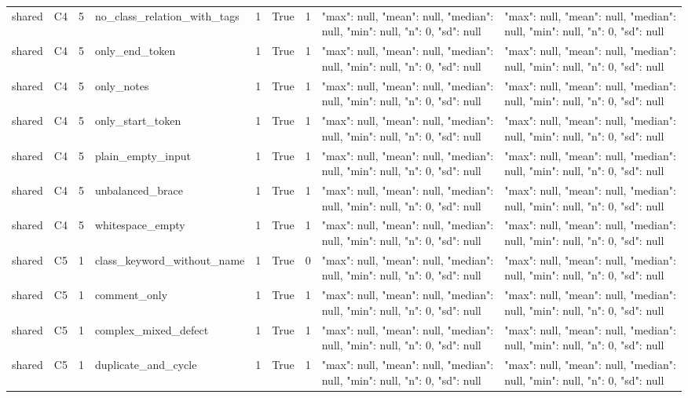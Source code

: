 \begin{tabular}{lllllllll}
shared & C4 & 5 & no\_class\_relation\_with\_tags & 1 & True & 1 & {"max": null, "mean": null, "median": null, "min": null, "n": 0, "sd": null} & {"max": null, "mean": null, "median": null, "min": null, "n": 0, "sd": null} \\
shared & C4 & 5 & only\_end\_token & 1 & True & 1 & {"max": null, "mean": null, "median": null, "min": null, "n": 0, "sd": null} & {"max": null, "mean": null, "median": null, "min": null, "n": 0, "sd": null} \\
shared & C4 & 5 & only\_notes & 1 & True & 1 & {"max": null, "mean": null, "median": null, "min": null, "n": 0, "sd": null} & {"max": null, "mean": null, "median": null, "min": null, "n": 0, "sd": null} \\
shared & C4 & 5 & only\_start\_token & 1 & True & 1 & {"max": null, "mean": null, "median": null, "min": null, "n": 0, "sd": null} & {"max": null, "mean": null, "median": null, "min": null, "n": 0, "sd": null} \\
shared & C4 & 5 & plain\_empty\_input & 1 & True & 1 & {"max": null, "mean": null, "median": null, "min": null, "n": 0, "sd": null} & {"max": null, "mean": null, "median": null, "min": null, "n": 0, "sd": null} \\
shared & C4 & 5 & unbalanced\_brace & 1 & True & 1 & {"max": null, "mean": null, "median": null, "min": null, "n": 0, "sd": null} & {"max": null, "mean": null, "median": null, "min": null, "n": 0, "sd": null} \\
shared & C4 & 5 & whitespace\_empty & 1 & True & 1 & {"max": null, "mean": null, "median": null, "min": null, "n": 0, "sd": null} & {"max": null, "mean": null, "median": null, "min": null, "n": 0, "sd": null} \\
shared & C5 & 1 & class\_keyword\_without\_name & 1 & True & 0 & {"max": null, "mean": null, "median": null, "min": null, "n": 0, "sd": null} & {"max": null, "mean": null, "median": null, "min": null, "n": 0, "sd": null} \\
shared & C5 & 1 & comment\_only & 1 & True & 1 & {"max": null, "mean": null, "median": null, "min": null, "n": 0, "sd": null} & {"max": null, "mean": null, "median": null, "min": null, "n": 0, "sd": null} \\
shared & C5 & 1 & complex\_mixed\_defect & 1 & True & 1 & {"max": null, "mean": null, "median": null, "min": null, "n": 0, "sd": null} & {"max": null, "mean": null, "median": null, "min": null, "n": 0, "sd": null} \\
shared & C5 & 1 & duplicate\_and\_cycle & 1 & True & 1 & {"max": null, "mean": null, "median": null, "min": null, "n": 0, "sd": null} & {"max": null, "mean": null, "median": null, "min": null, "n": 0, "sd": null} \\

\end{tabular}
